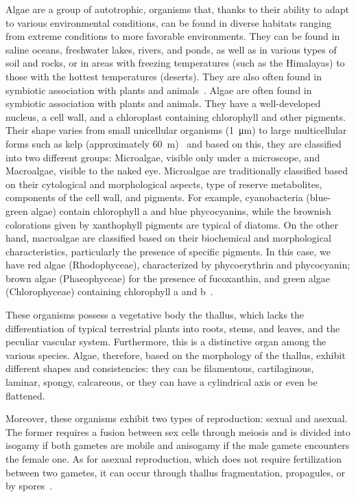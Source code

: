 Algae are a group of autotrophic, organisms that, thanks to their ability to adapt to various environmental conditions, can be found in diverse habitats ranging from extreme conditions to more favorable environments. They can be found in saline oceans, freshwater lakes, rivers, and ponds, as well as in various types of soil and rocks, or in areas with freezing temperatures (such as the Himalayas) to those with the hottest temperatures (deserts). They are also often found in symbiotic association with plants and animals~\parencite{rindi_Diversity_2007}. Algae are often found in symbiotic association with plants and animals. They have a well-developed nucleus, a cell wall, and a chloroplast containing chlorophyll and other pigments. Their shape varies from small unicellular organisms (\qty{1}{\micro\metre}) to large multicellular forms such as kelp (approximately \qty{60}{\metre})~\parencite{sahoo_Algae_2015} and based on this, they are classified into two different groups: Microalgae, visible only under a microscope, and Macroalgae, visible to the naked eye. Microalgae are traditionally classified based on their cytological and morphological aspects, type of reserve metabolites, components of the cell wall, and pigments. For example, cyanobacteria (blue-green algae) contain chlorophyll a and blue phycocyanins, while the brownish colorations given by xanthophyll pigments are typical of diatoms. On the other hand, macroalgae are classified based on their biochemical and morphological characteristics, particularly the presence of specific pigments. In this case, we have red algae (Rhodophyceae), characterized by phycoerythrin and phycocyanin; brown algae (Phaeophyceae) for the presence of fucoxanthin, and green algae (Chlorophyceae) containing chlorophyll a and b~\parencite{scieszka_Algae_2019}.

These organisms possess a vegetative body the thallus, which lacks the differentiation of typical terrestrial plants into roots, stems, and leaves, and the peculiar vascular system. Furthermore, this is a distinctive organ among the various species. Algae, therefore, based on the morphology of the thallus, exhibit different shapes and consistencies: they can be filamentous, cartilaginous, laminar, spongy, calcareous, or they can have a cylindrical axis or even be flattened.

Moreover, these organisms exhibit two types of reproduction: sexual and asexual. The former requires a fusion between sex cells through meiosis and is divided into isogamy if both gametes are mobile and anisogamy if the male gamete encounters the female one. As for asexual reproduction, which does not require fertilization between two gametes, it can occur through thallus fragmentation, propagules, or by spores~\parencite{pereira_Macroalgae_2021}.


